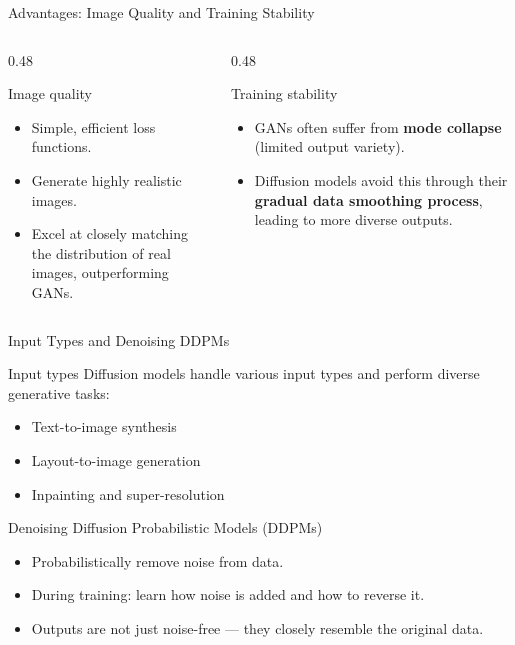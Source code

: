 \documentclass[aspectratio=169,10pt]{beamer}
\begin{document}
\begin{frame}{Advantages: Image Quality and Training Stability}
  \begin{columns}[T]
    \begin{column}{0.48\textwidth}
      \begin{block}{Image quality}
        \begin{itemize}
          \item Simple, efficient loss functions.
          \item Generate highly realistic images.
          \item Excel at closely matching the distribution of real images,
                outperforming GANs.
        \end{itemize}
      \end{block}
    \end{column}
    \begin{column}{0.48\textwidth}
      \begin{block}{Training stability}
        \begin{itemize}
          \item GANs often suffer from \textbf{mode collapse}
                (limited output variety).
          \item Diffusion models avoid this through their
                \textbf{gradual data smoothing process}, leading to
                more diverse outputs.
        \end{itemize}
      \end{block}
    \end{column}
  \end{columns}
\end{frame}

\begin{frame}{Input Types and Denoising DDPMs}
  \begin{block}{Input types}
    Diffusion models handle various input types and perform diverse
    generative tasks:
    \begin{itemize}
      \item Text-to-image synthesis
      \item Layout-to-image generation
      \item Inpainting and super-resolution
    \end{itemize}
  \end{block}
  \begin{block}{Denoising Diffusion Probabilistic Models (DDPMs)}
    \begin{itemize}
      \item Probabilistically remove noise from data.
      \item During training: learn how noise is added and how to reverse it.
      \item Outputs are not just noise-free — they closely resemble the
            original data.
    \end{itemize}
  \end{block}
\end{frame}
\end{document}
